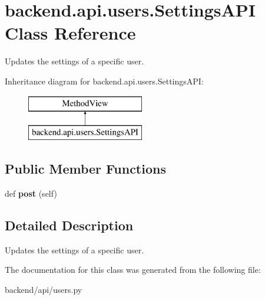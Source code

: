 \hypertarget{classbackend_1_1api_1_1users_1_1_settings_a_p_i}{}\section{backend.\+api.\+users.\+Settings\+A\+P\+I Class Reference}
\label{classbackend_1_1api_1_1users_1_1_settings_a_p_i}


Updates the settings of a specific user.  


Inheritance diagram for backend.\+api.\+users.\+Settings\+A\+P\+I\+:\begin{figure}[H]
\begin{center}
\leavevmode
\includegraphics[height=2.000000cm]{classbackend_1_1api_1_1users_1_1_settings_a_p_i}
\end{center}
\end{figure}
\subsection*{Public Member Functions}
\begin{DoxyCompactItemize}
\item 
\hypertarget{classbackend_1_1api_1_1users_1_1_settings_a_p_i_ad6fd923bd8e89fd3c2a81bea95d1c835}{}def {\bfseries post} (self)\label{classbackend_1_1api_1_1users_1_1_settings_a_p_i_ad6fd923bd8e89fd3c2a81bea95d1c835}

\end{DoxyCompactItemize}


\subsection{Detailed Description}
Updates the settings of a specific user. 

The documentation for this class was generated from the following file\+:\begin{DoxyCompactItemize}
\item 
backend/api/users.\+py\end{DoxyCompactItemize}
